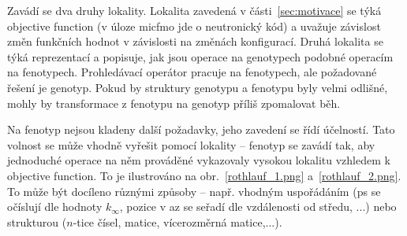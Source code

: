 Zavádí se dva druhy lokality. Lokalita zavedená v části~\ref{sec:motivace} se týká objective function (v úloze \ac{micfmo} jde o neutronický kód) 
a uvažuje závislost změn funkčních hodnot v závislosti na změnách konfigurací. Druhá lokalita se týká reprezentací a popisuje, jak jsou operace 
na genotypech podobné operacím na fenotypech. Prohledávací operátor pracuje na fenotypech, ale požadované řešení je genotyp. Pokud by struktury 
genotypu a fenotypu byly velmi odlišné, mohly by transformace z fenotypu na genotyp příliš zpomalovat běh. 

Na fenotyp nejsou kladeny další požadavky, jeho zavedení se řídí účelností. Tato volnost se může vhodně vyřešit pomocí lokality -- fenotyp se 
zavádí tak, aby jednoduché operace na něm prováděné vykazovaly vysokou lokalitu vzhledem k objective function. To je ilustrováno na 
obr.~\ref{rothlauf_1.png} a~\ref{rothlauf_2.png}. To může být docíleno různými způsoby -- např. vhodným uspořádáním (\ac{ps} se očíslují dle hodnoty 
$k_{\infty}$, pozice v \ac{az} se seřadí dle vzdálenosti od středu, ...) nebo strukturou ($n$-tice čísel, matice, vícerozměrná matice,...). 

% 

